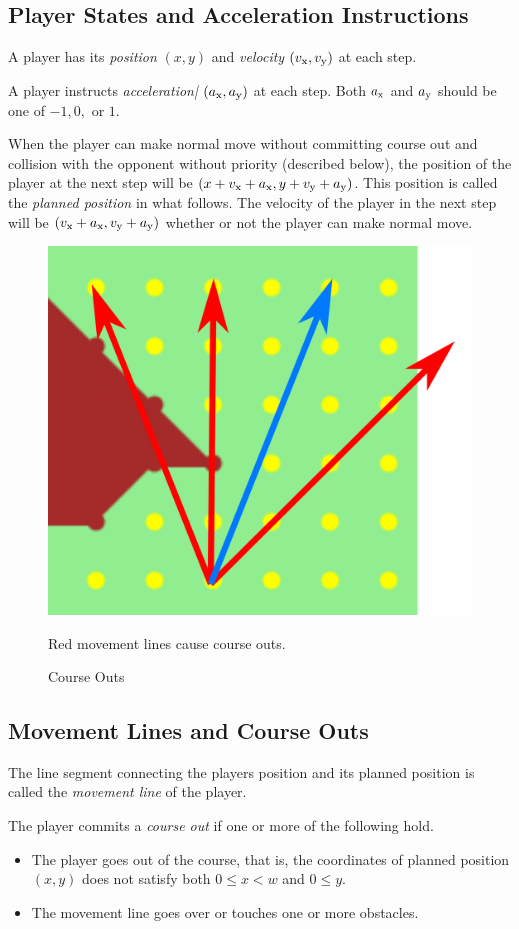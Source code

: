 \documentclass[11pt]{article}
\begin{document}
\subsection{Player States and Acceleration Instructions}
A player has its {\em position} $(x, y)$ and {\em velocity} $(v_{\rm
  x}, v_{\rm y})$ at each step.

A player instructs {\em acceleration|} $(a_{\rm x}, a_{\rm y})$ at each step.
Both $a_{\rm x}$ and $a_{\rm y}$ should be one of $-1, 0,$ or $1.$

When the player can make normal move without committing course out and
collision with the opponent without priority (described below), the
position of the player at the next step will be $(x+v_{\rm x}+a_{\rm
  x}, y+v_{\rm y}+a_{\rm y})$.  This position is called the {\em
  planned position} in what follows.  The velocity of the player in
the next step will be $(v_{\rm x}+a_{\rm x}, v_{\rm y}+a_{\rm y})$
whether or not the player can make normal move.

\begin{figure}
  \vspace{-1cm}
  \centering
  \includegraphics[width=0.26\columnwidth, natwidth=1358, natheight=1181]{courseout.png}
  \caption{Course Outs}
  \label{fig:courseout}
  Red movement lines cause course outs.
  \vspace{-1cm}
\end{figure}

\subsection{Movement Lines and Course Outs}
The line segment connecting the players position and its planned position is called the {\em movement line} of the player.

The player commits a {\em course out} if one or more of the
following hold.
\begin{itemize}
\item
  The player goes out of the course, that is, the coordinates of
  planned position $(x, y)$ does not satisfy both $0\le x<w$ and $0\le
  y.$
\item
  The movement line goes over or touches one or more obstacles.
\end{itemize}
\end{document}
